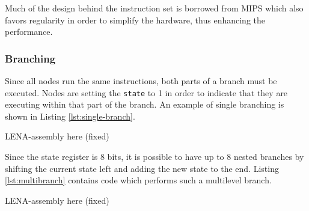 Much of the design behind the instruction set is borrowed from \ac{MIPS} which also 
favors regularity in order to simplify the hardware, thus enhancing the performance.

\subsubsection{Branching}
Since all nodes run the same instructions, both parts of a branch must be
executed. Nodes are setting the {\tt state} to 1 in order to indicate that they
are executing within that part of the branch. An example of single branching is
shown in Listing \ref{lst:single-branch}.

{\sc \color{green} LENA-assembly here (fixed)}

Since the state register is 8 bits, it is possible to have up to 8 nested
branches by shifting the current state left and adding the new state to the
end. Listing \ref{lst:multibranch} contains code which performs such a
multilevel branch.

{\sc \color{green} LENA-assembly here (fixed)}
